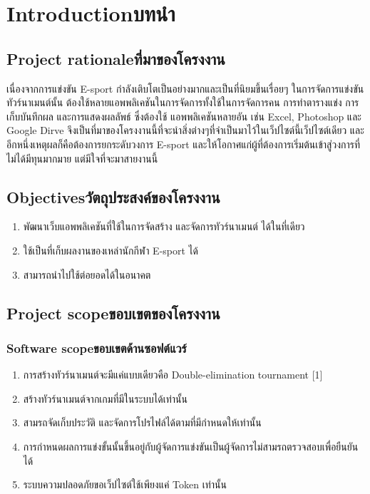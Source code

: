 \chapter{\ifenglish Introduction\else บทนำ\fi}

\section{\ifenglish Project rationale\else ที่มาของโครงงาน\fi}
เนื่องจากการแข่งขัน E-sport กำลังเติบโตเป็นอย่างมากและเป็นที่นิยมขึ้นเรื่อยๆ ในการจัดการแข่งขันทัวร์นาเมนต์นั้น
ต้องใช้หลายแอพพลิเคชันในการจัดการทั้งใช้ในการจัดการคน การทำตารางแข่ง การเก็บบันทึกผล และการแสดงผลลัพธ์ ซึ่งต้องใช้
แอพพลิเคชันหลายอัน เช่น Excel, Photoshop และ Google Dirve   จึงเป็นที่มาของโครงงานนี้ที่จะนำสิ่งต่างๆที่จำเป็นมาไว้ในเว็ปไซต์นี้เว็ปไซต์เดียว
และ อีกหนึ่งเหตุผลก็คือต้องการยกระดับวงการ E-sport และให้โอกาศแก่ผู้ที่ต้องการเริ่มต้นเข้าสู่วงการที่ไม่ได้มีทุนมากมาย แต่มีใจที่จะมาสายงานนี้  


\section{\ifenglish Objectives\else วัตถุประสงค์ของโครงงาน\fi}
\begin{enumerate}
    \item พัฒนาเว็บแอพพลิเคชันที่ใช้ในการจัดสร้าง และจัดการทัวร์นาเมนต์ ได้ในที่เดียว
    \item ใช้เป็นที่เก็บผลงานของเหล่านักกีฬา E-sport ได้
    \item สามารถนำไปใช้ต่อยอดได้ในอนาคต
\end{enumerate}

\section{\ifenglish Project scope\else ขอบเขตของโครงงาน\fi}

\subsection{\ifenglish Software scope\else ขอบเขตด้านซอฟต์แวร์\fi}
\begin{enumerate}
    \item การสร้างทัวร์นาเมนต์จะมีแค่แบบเดียวคือ Double-elimination tournament [1]
    \item สร้างทัวร์นาเมนต์จากเกมที่มีในระบบได้เท่านั้น 
    \item สามรถจัดเก็บประวัติ และจัดการโปรไฟล์ได้ตามที่มีกำหนดให้เท่านั้น
    \item การกำหนดผลการแข่งขั้นนั้นขึ้นอยู่กับผู้จัดการแข่งขันเป็นผู้จัดการไม่สามรถตรวจสอบเพื่อยืนยันได้
    \item ระบบความปลอดภัยขอเว็ปไซต์ใช้เพียงแค่ Token เท่านั้น
\end{enumerate}

